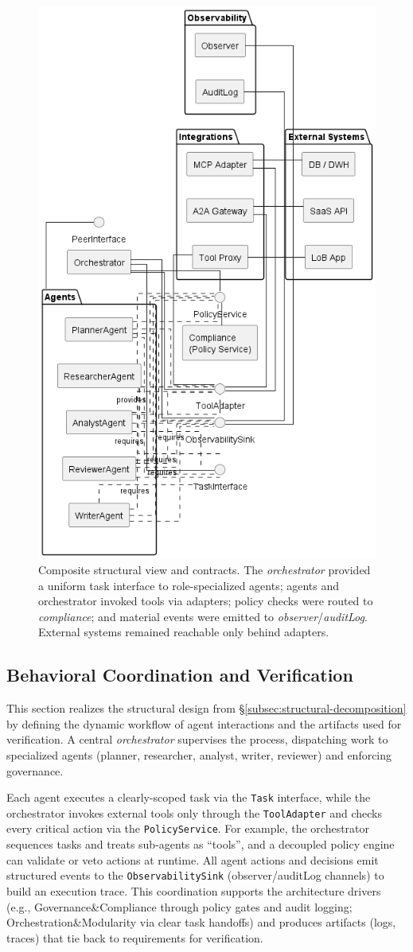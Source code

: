 \begin{figure}[H]
  \centering
  \includegraphics[width=0.5\linewidth]{ressources/MAS/figures/5_2_struct_overview.png}
  \caption{Composite structural view and contracts. The \emph{orchestrator} provided a uniform task interface to role-specialized agents; agents and orchestrator invoked tools via adapters; policy checks were routed to \emph{compliance}; and material events were emitted to \emph{observer}/\emph{auditLog}. External systems remained reachable only behind adapters.}\label{fig:5.2-struct-overview}
\end{figure}

\subsection{Behavioral Coordination and Verification}\label{subsec:behav}
This section realizes the structural design from §\ref{subsec:structural-decomposition} by defining the dynamic workflow of agent interactions and the artifacts used for verification. A central \emph{orchestrator} supervises the process, dispatching work to specialized agents (planner, researcher, analyst, writer, reviewer) and enforcing governance.

Each agent executes a clearly-scoped task via the \texttt{Task} interface, while the orchestrator invokes external tools only through the \texttt{ToolAdapter} and checks every critical action via the \texttt{PolicyService}. For example, the orchestrator sequences tasks and treats sub-agents as “tools”, and a decoupled policy engine can validate or veto actions at runtime. All agent actions and decisions emit structured events to the \texttt{ObservabilitySink} (observer/auditLog channels) to build an execution trace. This coordination supports the architecture drivers (e.g., Governance&Compliance through policy gates and audit logging; Orchestration&Modularity via clear task handoffs) and produces artifacts (logs, traces) that tie back to requirements for verification.

